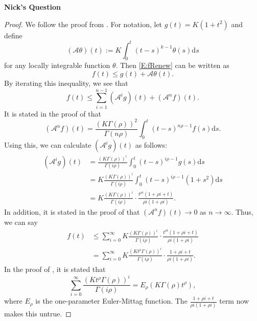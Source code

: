 \documentclass[a4paper,11pt]{article}
\numberwithin{equation}{section}
\theoremstyle{plain}
\theoremstyle{definition}
\newcommand{\ud}{\ensuremath{\mathrm{d} }}
\newcounter{NQ}
\newenvironment{NickQuestion}[1][] %
{\refstepcounter{NQ}
	\begin{mdframed}[backgroundcolor=lightgray]\textbf{Nick's Question \theNQ \: #1~~}~~~\noindent}%
	{\end{mdframed}}
\numberwithin{NQ}{section}
\numberwithin{LQ}{section}
\numberwithin{ZQ}{section}
\begin{document}
\begin{NickQuestion}
		\begin{proof}
			We follow the proof from \cite[Proposition 2.5]{FT2014}. For notation, let $g(t) = K(1+t^2)$ and define 
			\[
			(\mathcal{A}\theta)(t) := K\int_0^t (t-s)^{k-1} \theta(s) \ud s
			\]
			for any locally integrable function $\theta$. Then \eqref{E:fRenew} can be written as 
			\[
			f(t) \le g(t) + \mathcal{A}\theta(t).
			\]
			By iterating this inequality, we see that 
			\[
			f(t) \le \sum_{i=1}^{n-1} (\mathcal{A}^i g)(t) + (\mathcal{A}^n f)(t).
			\]
			It is stated in the proof of \cite[Proposition 2.5]{FT2014} that 
			\[
			(\mathcal{A}^n f)(t) = \frac{\left(K\Gamma(\rho)\right)^2}{\Gamma(n\rho)} \int_0^t (t-s)^{n\rho -1} f(s) \ud s.
			\]
			Using this, we can calculate $(\mathcal{A}^i g)(t)$ as follows:
			\begin{align*}
			(\mathcal{A}^i g)(t) &=  \frac{\left(K\Gamma(\rho)\right)^i}{\Gamma(i\rho)} \int_0^t (t-s)^{i\rho -1} g(s) \ud s \\
			&= K\frac{\left(K\Gamma(\rho)\right)^i}{\Gamma(i\rho)} \int_0^t (t-s)^{i\rho -1} (1+s^2)  \ud s \\
			&= K\frac{\left(K\Gamma(\rho)\right)^i}{\Gamma(i\rho)} \cdot \frac{t^{\rho i}(1+\rho i + t)}{\rho i (1 + \rho i)}.
			\end{align*}
			In addition, it is stated in the proof of \cite[Proposition 2.5]{FT2014} that $(\mathcal{A}^n f)(t) \to 0$ as $n \to \infty$. Thus, we can say 
			\begin{align*}
			f(t) &\le \sum_{i=0}^\infty K\frac{\left(K\Gamma(\rho)\right)^i}{\Gamma(i\rho)} \cdot \frac{t^{\rho i}(1+\rho i + t)}{\rho i (1 + \rho i)} \\
			&= \sum_{i=0}^\infty K\frac{\left(Kt^{\rho }\Gamma(\rho)\right)^i}{\Gamma(i\rho)} \cdot \frac{1+\rho i + t}{\rho i (1 + \rho i)} .
			\end{align*}
			In the proof of \cite[Proposition 2.5]{FT2014}, it is stated that 
			\[
			\sum_{i=0}^\infty \frac{\left(Kt^{\rho }\Gamma(\rho)\right)^i}{\Gamma(i\rho)} = E_{\rho}\left( K\Gamma(\rho) t^\rho \right),
			\]
			where $E_\rho$ is the one-parameter Euler-Mittag function. The $\frac{1+\rho i + t}{\rho i (1 + \rho i)}$ term now makes this untrue. 
		\end{proof}
		
		
		
	\end{NickQuestion}
\end{document}
